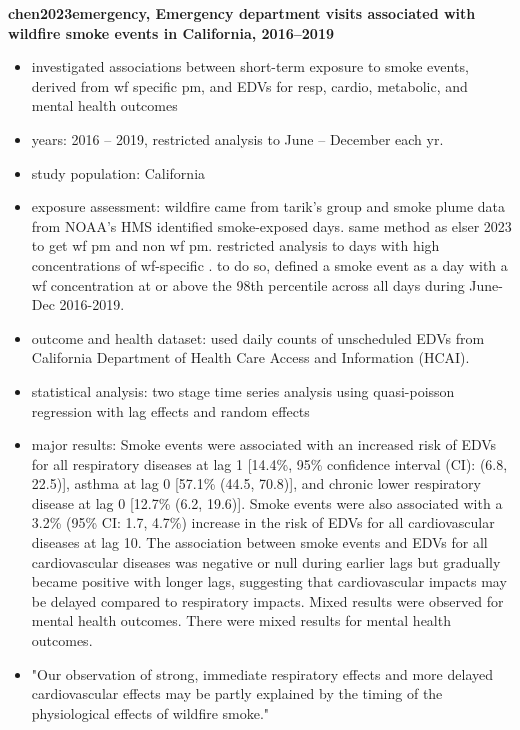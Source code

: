\textbf{chen2023emergency, Emergency department visits associated with wildfire smoke events in California, 2016--2019}
\begin{itemize}
    \item investigated associations between short-term exposure to smoke events, derived from wf specific pm, and EDVs for resp, cardio, metabolic, and mental health outcomes 
    \item years: 2016 -- 2019, restricted analysis to June -- December each yr. 
    \item study population: California 
    \item exposure assessment: wildfire \PM came from tarik's group and smoke plume data from NOAA's HMS identified smoke-exposed days. same method as elser 2023 to get wf pm and non wf pm. restricted analysis to days with high concentrations of wf-specific \PM. to do so, defined a smoke event as a day with a wf \PM concentration at or above the 98th percentile across all days during June-Dec 2016-2019.
    \item outcome and health dataset: used daily counts of unscheduled EDVs from California Department of Health Care Access and Information (HCAI). 
    \item statistical analysis: two stage time series analysis using quasi-poisson regression with lag effects and random effects
    \item major results: Smoke events were associated with an increased risk of EDVs for all respiratory diseases at lag 1 [14.4\%, 95\% confidence interval (CI): (6.8, 22.5)], asthma at lag 0 [57.1\% (44.5, 70.8)], and chronic lower respiratory disease at lag 0 [12.7\% (6.2, 19.6)]. Smoke events were also associated with a 3.2\% (95\% CI: 1.7, 4.7\%) increase in the risk of EDVs for all cardiovascular diseases at lag 10. The association between smoke events and EDVs for all cardiovascular diseases was negative or null during earlier lags but gradually became positive with longer lags, suggesting that cardiovascular impacts may be delayed compared to respiratory impacts. Mixed results were observed for mental health outcomes. There were mixed results for mental health outcomes. 
    \item "Our observation of strong, immediate respiratory effects and more delayed cardiovascular effects may be partly explained by the timing of the physiological effects of wildfire smoke."
\end{itemize}

